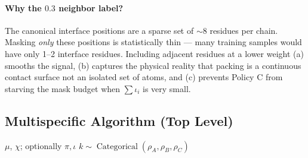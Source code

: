 \documentclass[11pt]{article}
\DeclareMathOperator{\Cat}{Categorical}
\begin{document}
\paragraph{Why the $0.3$ neighbor label?} The canonical interface
positions are a sparse set of $\sim 8$ residues per chain. Masking
\emph{only} these positions is statistically thin --- many training
samples would have only 1--2 interface residues. Including adjacent
residues at a lower weight (a) smooths the signal, (b) captures the
physical reality that packing is a continuous contact surface not an
isolated set of atoms, and (c) prevents Policy C from starving the
mask budget when $\sum \iota_i$ is very small.

\subsection{Multispecific Algorithm (Top Level)}
\begin{algorithm}[H]
\caption{Multispecific Masking}
\begin{algorithmic}[1]
\Require $\mu$, $\chi$; optionally $\pi, \iota$
 \Return {} \EndIf
\State $k \sim \Cat(\rho_A, \rho_B, \rho_C)$
 \Return {} \EndIf
{} \Return {} \EndIf
{}
   \Return {} \EndIf
  \State \Return {}
\EndIf
\end{algorithmic}
\end{algorithm}
\end{document}

